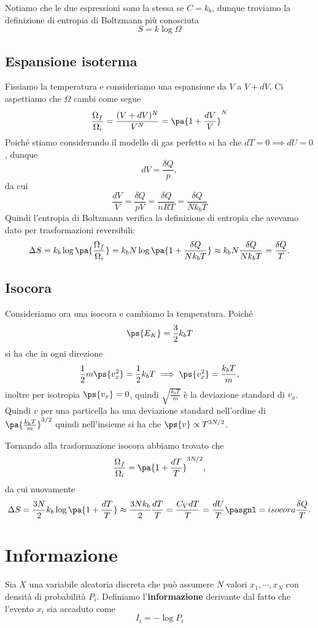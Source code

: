 \noindent Notiamo che le due espressioni sono la stessa se $C=k_b$, dunque troviamo la definizione di entropia di Boltzmann pi\`u conosciuta
\[\boxed{S=k\log \Omega}\]

\subsection{Espansione isoterma}
Fissiamo la temperatura e consideriamo una espansione da $V$ a $V+dV$. Ci aspettiamo che $\Omega$ cambi come segue
\[\frac{\Omega_f}{\Omega_i}=\frac{(V+dV)^N}{V^N}=\pa{1+\frac{dV}V}^N\]
Poich\'e stiamo considerando il modello di gas perfetto si ha che $dT=0\implies dU=0$, dunque
\[dV=\frac{\delta Q}p,\]
da cui
\[\frac{dV}V=\frac{\delta Q}{pV}=\frac{\delta Q}{nRT}=\frac{\delta Q}{Nk_b T}\]
Quindi l'entropia di Boltzmann verifica la definizione di entropia che avevamo dato per trasformazioni reversibili:
\[\Delta S=k_b\log\pa{\frac{\Omega_f}{\Omega_i}}=k_b N\log\pa{1+\frac{\delta Q}{Nk_b T}}\approx k_bN\frac{\delta Q}{Nk_bT}=\frac{\delta Q}T.\]

\subsection{Isocora}
Consideriamo ora una isocora e cambiamo la temperatura. Poich\'e
\[\ps{E_K}=\frac32k_bT\]
si ha che in ogni direzione 
\[\frac12m\ps{v_x^2}=\frac12 k_bT\implies \ps{v_x^2}=\frac{k_bT}m,\]
inoltre per isotropia $\ps{v_x}=0$, quindi $\sqrt{\frac{k_bT}m}$ \`e la deviazione standard di $v_x$.
Quindi $v$ per una particella ha una deviazione standard nell'ordine di $\pa{\frac{k_bT}m}^{3/2}$ quindi nell'insieme si ha che $\ps{v}\propto T^{3N/2}$.
\medskip

\noindent
Tornando alla trasformazione isocora abbiamo trovato che 
\[\frac{\Omega_f}{\Omega_i}=\pa{1+\frac{dT}T}^{3N/2},\]
da cui nuovamente
\[\Delta S=\frac{3N}2k_b\log\pa{1+\frac{dT}T}\approx \frac{3Nk_b}2\frac{dT}T=\frac{C_VdT}T=\frac{dU}T\pasgnl={isocora}\frac{\delta Q}T.\]



\section{Informazione}
\begin{definition}[Informazione]
Sia $X$ una variabile aleatoria discreta che pu\`o assumere $N$ valori $x_1,\cdots, x_N$ con densit\`a di probabilit\`a $P_i$. 
Definiamo l'\textbf{informazione} derivante dal fatto che l'evento $x_i$ sia accaduto come
\[I_i=-\log P_i\]
\end{definition}

